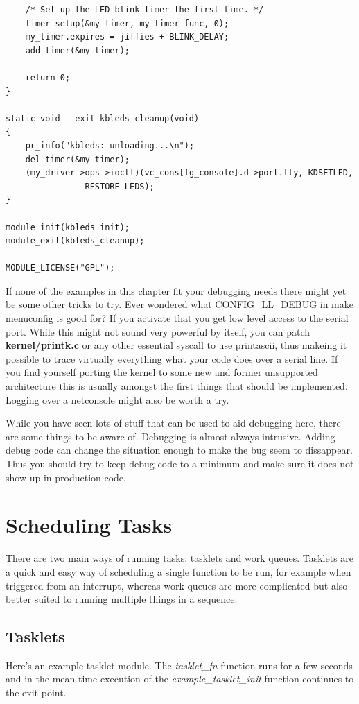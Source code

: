 \documentclass[11pt]{article}
\begin{document}
\begin{verbatim}
    /* Set up the LED blink timer the first time. */
    timer_setup(&my_timer, my_timer_func, 0);
    my_timer.expires = jiffies + BLINK_DELAY;
    add_timer(&my_timer);

    return 0;
}

static void __exit kbleds_cleanup(void)
{
    pr_info("kbleds: unloading...\n");
    del_timer(&my_timer);
    (my_driver->ops->ioctl)(vc_cons[fg_console].d->port.tty, KDSETLED,
			    RESTORE_LEDS);
}

module_init(kbleds_init);
module_exit(kbleds_cleanup);

MODULE_LICENSE("GPL");
\end{verbatim}

If none of the examples in this chapter fit your debugging needs there might yet be some other tricks to try. Ever wondered what CONFIG\_LL\_DEBUG in make menuconfig is good for? If you activate that you get low level access to the serial port. While this might not sound very powerful by itself, you can patch \textbf{kernel/printk.c} or any other essential syscall to use printascii, thus makeing it possible to trace virtually everything what your code does over a serial line. If you find yourself porting the kernel to some new and former unsupported architecture this is usually amongst the first things that should be implemented. Logging over a netconsole might also be worth a try.

While you have seen lots of stuff that can be used to aid debugging here, there are some things to be aware of. Debugging is almost always intrusive. Adding debug code can change the situation enough to make the bug seem to dissappear. Thus you should try to keep debug code to a minimum and make sure it does not show up in production code.

\section{Scheduling Tasks}
\label{sec:orgd34b905}
There are two main ways of running tasks: tasklets and work queues. Tasklets are a quick and easy way of scheduling a single function to be run, for example when triggered from an interrupt, whereas work queues are more complicated but also better suited to running multiple things in a sequence.

\subsection{Tasklets}
\label{sec:org8634838}
Here's an example tasklet module. The \emph{tasklet\_fn} function runs for a few seconds and in the mean time execution of the \emph{example\_tasklet\_init} function continues to the exit point.
\end{document}
